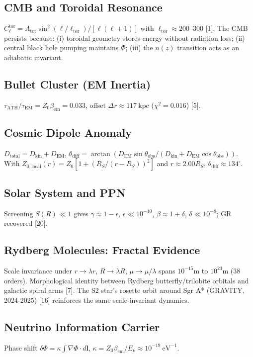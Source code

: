\documentclass[12pt, a4paper]{article}
\begin{document}
\subsection{CMB and Toroidal Resonance}
$C_{\ell}^{\mathrm{tor}} = A_{\mathrm{tor}}\sin^{2}(\ell /\ell_{\mathrm{tor}}) / [\ell (\ell +1)]$ with $\ell_{\mathrm{tor}} \approx 200$--$300$ [1]. The CMB persists because: (i) toroidal geometry stores energy without radiation loss; (ii) central black hole pumping maintains $\Phi$; (iii) the $n(z)$ transition acts as an adiabatic invariant.

\subsection{Bullet Cluster (EM Inertia)}
$\tau_{\mathrm{ATH}} / \tau_{\mathrm{EM}} = Z_{0}\beta_{\mathrm{em}} = 0.033$, offset $\Delta r\approx 117\ \mathrm{kpc}$ ($\chi^{2} = 0.016$) [5].

\subsection{Cosmic Dipole Anomaly}
$D_{\mathrm{total}} = D_{\mathrm{kin}} + D_{\mathrm{EM}}$, $\theta_{\mathrm{diff}} = \arctan \left( D_{\mathrm{EM}}\sin \theta_{\mathrm{obs}} / (D_{\mathrm{kin}} + D_{\mathrm{EM}}\cos \theta_{\mathrm{obs}}) \right)$. With $Z_{0,\mathrm{local}}(r) = Z_{0}[1 + (R_{S} / (r - R_{S}))^{2}]$ and $r\approx 2.00R_{S}$, $\theta_{\mathrm{diff}}\approx 134^{\circ}$.

\subsection{Solar System and PPN}
Screening $S(R)\ll 1$ gives $\gamma \approx 1 - \epsilon$, $\epsilon \ll 10^{- 10}$, $\beta \approx 1 + \delta$, $\delta \ll 10^{- 8}$; GR recovered [20].

\subsection{Rydberg Molecules: Fractal Evidence}
Scale invariance under $r\rightarrow \lambda r$, $R\rightarrow \lambda R$, $\mu \rightarrow \mu /\lambda$ spans $10^{- 15}\mathrm{m}$ to $10^{23}\mathrm{m}$ (38 orders). Morphological identity between Rydberg butterfly/trilobite orbitals and galactic spiral arms [7]. The S2 star's rosette orbit around Sgr A* (GRAVITY, 2024-2025) [16] reinforces the same scale-invariant dynamics.

\subsection{Neutrino Information Carrier}
Phase shift $\delta \Phi = \kappa \int \nabla \Phi \cdot d\mathbf{l}$, $\kappa = Z_{0}\beta_{\mathrm{em}} / E_{\nu}\approx 10^{- 19}\ \mathrm{eV}^{-1}$.
\end{document}
